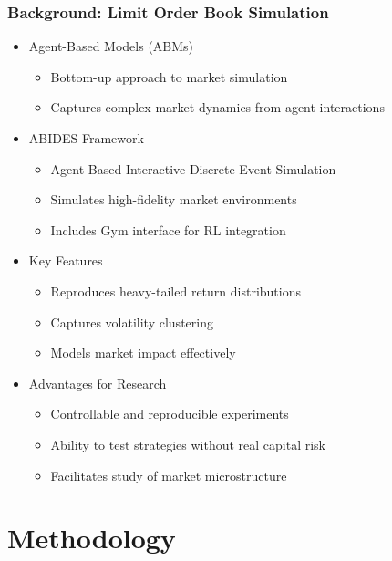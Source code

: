 \documentclass{beamer}
\begin{document}
\begin{frame}
  \frametitle{Background: Limit Order Book Simulation}

  \begin{itemize}
    \item Agent-Based Models (ABMs)
    \begin{itemize}
      \item Bottom-up approach to market simulation
      \item Captures complex market dynamics from agent interactions
    \end{itemize}
    \item ABIDES Framework \cite{byrd2020abides}
    \begin{itemize}
      \item Agent-Based Interactive Discrete Event Simulation
      \item Simulates high-fidelity market environments
      \item Includes Gym interface for RL integration
    \end{itemize}
    \item Key Features
    \begin{itemize}
      \item Reproduces heavy-tailed return distributions
      \item Captures volatility clustering
      \item Models market impact effectively
    \end{itemize}
    \item Advantages for Research
    \begin{itemize}
      \item Controllable and reproducible experiments
      \item Ability to test strategies without real capital risk
      \item Facilitates study of market microstructure
    \end{itemize}
  \end{itemize}

\end{frame}

\section{Methodology}
\end{document}
